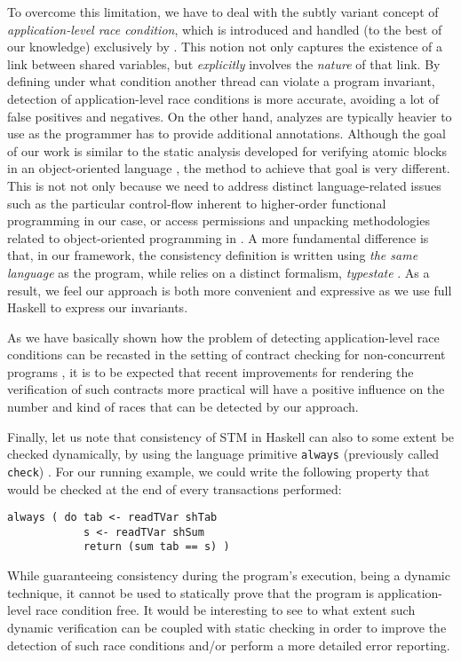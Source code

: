 \documentclass[submission,copyright,creativecommons]{eptcs}
\begin{document}
To overcome this limitation, we have to deal with the subtly variant concept of {\em application-level race condition}, which is introduced and handled (to the best of our knowledge) exclusively by \cite{verifying-correct-usage}. This notion not only captures the existence of a link between shared variables, but {\em explicitly} involves the {\em nature} of that link. By defining under what condition another thread can violate a program invariant, detection of application-level race conditions is more accurate, avoiding a lot of false positives and negatives. On the other hand, analyzes are typically heavier to use as the programmer has to provide additional annotations.    
Although the goal of our work is similar to the static analysis developed for verifying atomic blocks in an object-oriented language \cite{verifying-correct-usage}, the method to achieve that goal is very different. This is not not only because we need to address distinct language-related issues such as the particular control-flow inherent to higher-order functional programming in our case, or access permissions and unpacking methodologies related to object-oriented programming in \cite{verifying-correct-usage}. 
A more fundamental difference is that, in our framework, the consistency definition is written using \emph{the same language} as the program, while \cite{verifying-correct-usage} relies on a distinct formalism, \emph{typestate} \cite{typestates-for-objects}.
As a result, we feel our approach is both more convenient and expressive as we use full Haskell to express our invariants.

As we have basically shown how the problem of detecting application-level race conditions can be recasted in the setting of contract checking for non-concurrent programs \cite{static-contract-checking,sound-complete-models}, it is to be expected that recent improvements for rendering the verification of such contracts more practical \cite{halo-haskell-logic} will have a positive influence on the number and kind of races that can be detected by our approach.


Finally, let us note that consistency of STM in Haskell can also to some extent be checked dynamically, by using the language primitive \texttt{always} (previously called \texttt{check}) \cite{transactional-memory-data}. For our running example, we could write the following property that would be checked at the end of every transactions performed:

\begin{footnotesize}
\begin{verbatim}
always ( do tab <- readTVar shTab
            s <- readTVar shSum 
            return (sum tab == s) ) 
\end{verbatim}
\end{footnotesize}
While guaranteeing consistency during the program's execution, being a dynamic technique, it cannot be used to statically prove that the program is application-level race condition free. It would be interesting to see to what extent such dynamic verification can be coupled with static checking in order to improve the detection of such race conditions and/or perform a more detailed error reporting.
\end{document}
